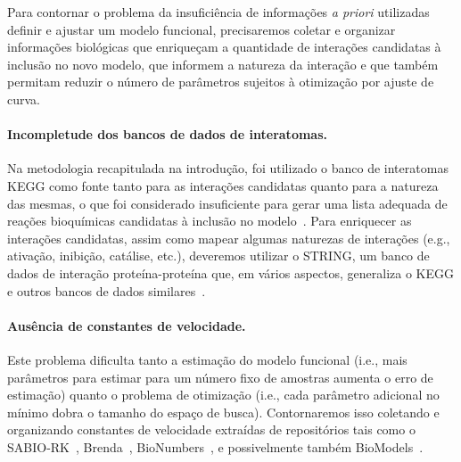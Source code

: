 \documentclass[12pt]{article}
\begin{document}
Para contornar o problema da insuficiência de informações {\em a priori} utilizadas definir e ajustar um modelo funcional, precisaremos coletar e organizar informações biológicas que enriqueçam a quantidade de interações candidatas à inclusão no novo modelo, que informem a natureza da interação e que também permitam reduzir o número de parâmetros sujeitos à otimização por ajuste de curva.

\paragraph{\bf Incompletude dos bancos de dados de interatomas.} Na metodologia recapitulada na introdução, foi utilizado o banco de interatomas KEGG como fonte tanto para as interações candidatas quanto para a natureza das mesmas, o que foi considerado insuficiente para gerar uma lista adequada de reações bioquímicas candidatas à inclusão no modelo~\cite{Wu2015metodo}. Para enriquecer as interações candidatas, assim como mapear algumas naturezas de interações (e.g., ativação, inibição, catálise, etc.), deveremos utilizar o STRING, um banco de dados de interação proteína-proteína que, em vários aspectos, generaliza o KEGG e outros bancos de dados similares~\cite{szklarczyk2010string}. 

\paragraph{\bf Ausência de constantes de velocidade.} Este problema dificulta tanto a estimação do modelo funcional (i.e., mais parâmetros para estimar para um número fixo de amostras aumenta o erro de estimação) quanto o problema de otimização (i.e., cada parâmetro adicional no mínimo dobra o tamanho do espaço de busca). Contornaremos isso coletando e organizando constantes de velocidade extraídas de repositórios tais como o SABIO-RK~\cite{doi:10.1093/nar/gkr1046}, Brenda~\cite{doi:10.1093/nar/gkh081}, BioNumbers~\cite{milo2009bionumbers}, e possivelmente também  BioModels~\cite{le2006biomodels}.
\end{document}

